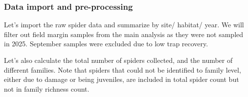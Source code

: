 \documentclass[
]{article}
\begin{document}
\subsubsection{Data import and
pre-processing}\label{data-import-and-pre-processing}

Let's import the raw spider data and summarize by site/ habitat/ year.
We will filter out field margin samples from the main analysis as they
were not sampled in 2025. September samples were excluded due to low
trap recovery.

Let's also calculate the total number of spiders collected, and the
number of different families. Note that spiders that could not be
identified to family level, either due to damage or being juveniles, are
included in total spider count but not in family richness count.
\end{document}
